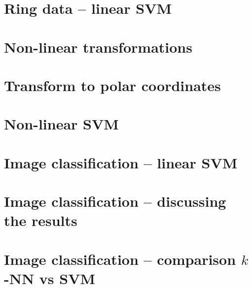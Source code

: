 \documentclass[a4paper,10pt,twoside]{article}
\begin{document}
\section{Ring data -- linear SVM}

\section{Non-linear transformations}

\section{Transform to polar coordinates}

\section{Non-linear SVM}

\section{Image classification -- linear SVM}

\section{Image classification -- discussing the results}

\section{Image classification -- comparison $k$-NN vs SVM}


%
%
\end{document}
